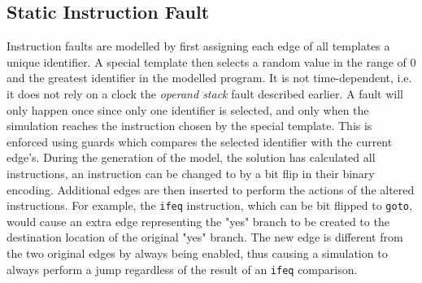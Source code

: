 \subsection{Static Instruction Fault}
Instruction faults are modelled by first assigning each edge of all templates a unique identifier. A special template then selects a random value in the range of $0$ and the greatest identifier in the modelled program. It is not time-dependent, i.e. it does not rely on a clock the \textit{operand stack} fault described earlier. A fault will only happen once since only one identifier is selected, and only when the simulation reaches the instruction chosen by the special template. This is enforced using guards which compares the selected identifier with the current edge's. During the generation of the model, the solution has calculated all instructions, an instruction can be changed to by a bit flip in their binary encoding. Additional edges are then inserted to perform the actions of the altered instructions. For example, the \texttt{ifeq} instruction, which can be bit flipped to \texttt{goto}, would cause an extra edge representing the "yes" branch to be created to the destination location of the original "yes" branch. The new edge is different from the two original edges by always being enabled, thus causing a simulation to always perform a jump regardless of the result of an \texttt{ifeq} comparison.
